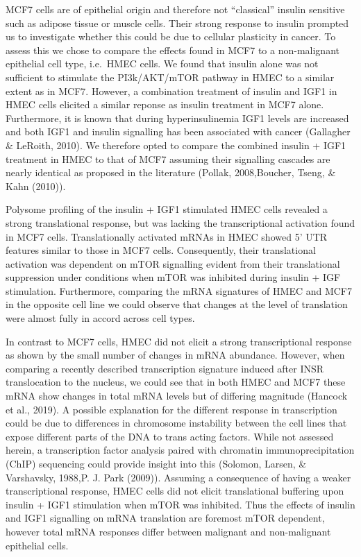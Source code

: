 \documentclass[12pt,openany]{book}
\begin{document}
MCF7 cells are of epithelial origin and therefore not ``classical''
insulin sensitive such as adipose tissue or muscle cells. Their strong
response to insulin prompted us to investigate whether this could be due
to cellular plasticity in cancer. To assess this we chose to compare the
effects found in MCF7 to a non-malignant epithelial cell type, i.e.~HMEC
cells. We found that insulin alone was not sufficient to stimulate the
PI3k/AKT/mTOR pathway in HMEC to a similar extent as in MCF7. However, a
combination treatment of insulin and IGF1 in HMEC cells elicited a
similar reponse as insulin treatment in MCF7 alone. Furthermore, it is
known that during hyperinsulinemia IGF1 levels are increased and both
IGF1 and insulin signalling has been associated with cancer (Gallagher
\& LeRoith, 2010). We therefore opted to compare the combined insulin +
IGF1 treatment in HMEC to that of MCF7 assuming their signalling
cascades are nearly identical as proposed in the literature (Pollak,
2008,Boucher, Tseng, \& Kahn (2010)).

Polysome profiling of the insulin + IGF1 stimulated HMEC cells revealed
a strong translational response, but was lacking the transcriptional
activation found in MCF7 cells. Translationally activated mRNAs in HMEC
showed 5' UTR features similar to those in MCF7 cells. Consequently,
their translational activation was dependent on mTOR signalling evident
from their translational suppression under conditions when mTOR was
inhibited during insulin + IGF stimulation. Furthermore, comparing the
mRNA signatures of HMEC and MCF7 in the opposite cell line we could
observe that changes at the level of translation were almost fully in
accord across cell types.

In contrast to MCF7 cells, HMEC did not elicit a strong transcriptional
response as shown by the small number of changes in mRNA abundance.
However, when comparing a recently described transcription signature
induced after INSR translocation to the nucleus, we could see that in
both HMEC and MCF7 these mRNA show changes in total mRNA levels but of
differing magnitude (Hancock et al., 2019). A possible explanation for
the different response in transcription could be due to differences in
chromosome instability between the cell lines that expose different
parts of the DNA to trans acting factors. While not assessed herein, a
transcription factor analysis paired with chromatin immunoprecipitation
(ChIP) sequencing could provide insight into this (Solomon, Larsen, \&
Varshavsky, 1988,P. J. Park (2009)). Assuming a consequence of having a
weaker transcriptional response, HMEC cells did not elicit translational
buffering upon insulin + IGF1 stimulation when mTOR was inhibited. Thus
the effects of insulin and IGF1 signalling on mRNA translation are
foremost mTOR dependent, however total mRNA responses differ between
malignant and non-malignant epithelial cells.
\end{document}
